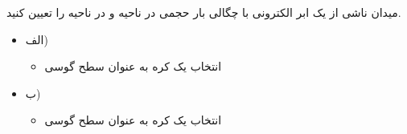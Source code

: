 
\begin{ELexample}{}

میدان  ناشی از یک ابر الکترونی با چگالی بار حجمی  در ناحیه  و  در ناحیه  را تعیین کنید.


\begin{ELsolution}


\begin{itemize}
\tightlist
\item
  الف) 

  \begin{itemize}
  \tightlist
  \item
    انتخاب یک کره به عنوان سطح گوسی
  \end{itemize}
\end{itemize}


\begin{itemize}
\tightlist
\item
  ب) 

  \begin{itemize}
  \tightlist
  \item
    انتخاب یک کره به عنوان سطح گوسی
  \end{itemize}
\end{itemize}


\end{ELsolution}

\end{ELexample}


